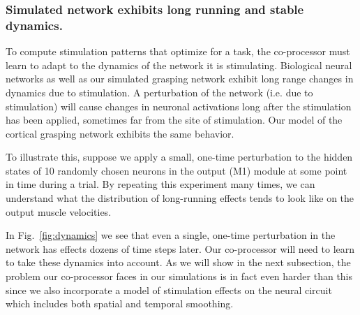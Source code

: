 \documentclass[12pt]{iopart}
\begin{document}
\subsubsection{Simulated network exhibits long running and stable dynamics.}
To compute stimulation patterns that optimize for a task, the co-processor must
learn to adapt to the dynamics of the network it is stimulating. Biological neural
networks as well as our simulated grasping network exhibit long range changes in dynamics
due to stimulation. A perturbation of the network (i.e. due to stimulation) will cause
changes in neuronal activations long after the stimulation has been applied, sometimes far
from the site of stimulation. Our model of the cortical grasping network exhibits the same
behavior.

To illustrate this, suppose we apply a small, one-time perturbation
to the hidden states of 10 randomly chosen neurons in the output (M1) module at some point
in time during a trial. By repeating this experiment many times, we can understand what the
distribution of long-running effects tends to look like on the output muscle velocities.

In Fig.~\ref{fig:dynamics} we see that even a single, one-time perturbation in
the network has effects dozens of time steps later. Our co-processor will need to learn to take
these dynamics into account. As we will show in the next subsection, the problem our co-processor
faces in our simulations is in fact even harder than this since we also incorporate
a model of stimulation effects on the neural circuit which includes both spatial and temporal
smoothing.
\end{document}
